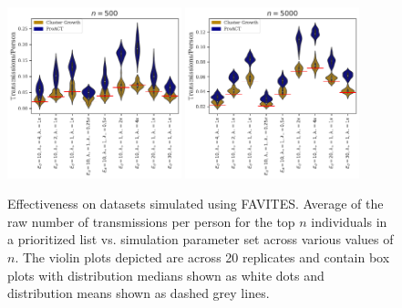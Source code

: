 \documentclass[a4paper,11pt]{article}
\begin{document}
\begin{figure}[!h]
\includegraphics[width=0.45\textwidth]{figs/results_efficacy_individual_n500.pdf}
\includegraphics[width=0.45\textwidth]{figs/results_efficacy_individual_n5000.pdf}\\
\caption{Effectiveness on datasets simulated using FAVITES. Average of the raw number of transmissions per person for the top $n$ individuals in a prioritized list vs. simulation parameter set across various values of $n$. The violin plots depicted are across 20 replicates and contain box plots with distribution medians shown as white dots and distribution means shown as dashed grey lines.}\label{fig:efficacy-vs-n}
\end{figure}

\clearpage
\end{document}
